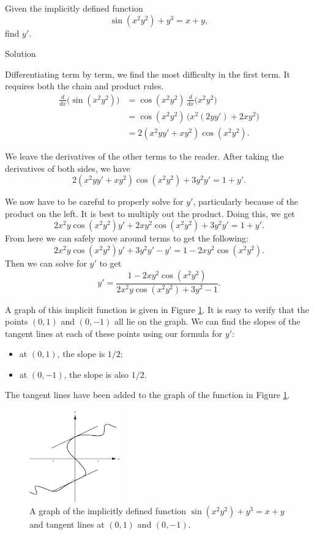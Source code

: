 \begin{example}\label{ex_implicit5}
Given the implicitly defined function 
$$\sin(x^2y^2)+y^3=x+y,$$
find $y'$.

\ifanalysis\pagebreak\fi
{}Solution 

Differentiating term by term, we find the most difficulty in the first term.  It requires both the chain and product rules.
		\begin{align*}
		\frac{d}{dx}\Big(\sin(x^2y^2)\Big) &= \cos(x^2y^2)\,\frac{d}{dx}\Big(x^2y^2\Big) \\
																				&= \cos(x^2y^2)\,\big(x^2(2yy')+2xy^2\big)\\
																				&= 2(x^2yy'+xy^2)\cos(x^2y^2).
		\end{align*}  

We leave the derivatives of the other terms to the reader. After taking the derivatives of both sides, we have
$$2(x^2yy'+xy^2)\cos(x^2y^2) + 3y^2y' = 1 + y'.$$

We now have to be careful to properly solve for $y'$, particularly because of the product on the left.  It is best to multiply out the product.  Doing this, we get
$$2x^2y\cos(x^2y^2)y' + 2xy^2\cos(x^2y^2) + 3y^2y' = 1 + y'.$$
From here we can safely move around terms to get the following:
$$2x^2y\cos(x^2y^2)y' + 3y^2y' - y' = 1 - 2xy^2\cos(x^2y^2).$$
Then we can solve for $y'$ to get
$$y' = \frac{1 - 2xy^2\cos(x^2y^2)}{2x^2y\cos(x^2y^2)+3y^2-1}.$$

A graph of this implicit function is given in Figure \ref{fig_diff_8}. It is easy to verify that the points $(0,1)$ and $(0,-1)$ all lie on the graph. We can find the slopes of the tangent lines at each of these points using our formula for $y'$: 
\begin{itemize}
\item at $(0,1)$, the slope is $1/2$;
\item at $(0,-1)$, the slope is also $1/2$.
\end{itemize}
The tangent lines have been added to the graph of the function in Figure \ref{fig_diff_8}.

\begin{figure}[H]
	\begin{center}
			\includegraphics[width=0.35\textwidth]{fig_diff_8}
	\caption{A graph of the implicitly defined function $\sin(x^2y^2)+y^3=x+y$ and tangent lines at  $(0,1)$ and $(0,-1)$.}
	\label{fig_diff_8}
	\end{center}
\end{figure}


\end{example}
